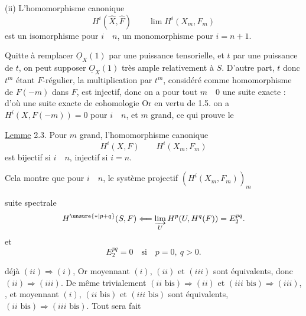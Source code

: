 (ii) L'homomorphisme canonique
\[
H^i(\widehat X,\widehat F)\qquad \lim H^i(X_m,F_m)
\]
est un isomorphisme pour $i\quad n$, un monomorphisme pour $i=n+1$.

 Quitte à remplacer $\underline O_X(1)$ par une puissance tensorielle, et $t$ par une puissance de $t$, on peut supposer $\underline O_X(1)$ très ample relativement à $S$. D'autre part, $t$ donc $t^m$ étant $F$-régulier, la multiplication par $t^m$, considéré comme homomorphisme de $F(-m)$ dans $F$, est injectif, donc on a pour tout $m\quad 0$ une suite exacte :
d'où une suite exacte de cohomologie
Or en vertu de 1.5. on a $H^i(X,F(-m))=0$ pour $i\quad n$, et $m$ grand, ce qui prouve le

\uline{Lemme} 2.3.  Pour $m$ grand, l'homomorphisme canonique
\[
H^i(X,F)\qquad H^i(X_m,F_m)
\]
est bijectif si $i\quad n$, injectif si $i=n$.

Cela montre que pour $i\quad n$, le système projectif $(H^i(X_m,F_m))_m$


 suite spectrale
\[
H^{\unsure{*|p+q}}(S,F)\Longleftarrow\varinjlim_U H^p(U,H^q(F))=E_2^{pq}.
\]
et
\[
E_2^{pq}=0\quad\text{si}\quad p=0,\ q>0.
\]

  déjà $(ii)\Rightarrow(i)$, Or moyennant $(i)$, $(ii)$ et $(iii)$ sont équivalents, donc $(ii)\Rightarrow(iii)$. De même trivialement $(ii\text{ bis})\Rightarrow(ii)$ et $(iii\text{ bis})\Rightarrow(iii)$, , et  moyennant $(i)$, $(ii\text{ bis})$ et $(iii\text{ bis})$ sont équivalents,  $(ii\text{ bis})\Rightarrow(iii\text{ bis})$. Tout sera fait


